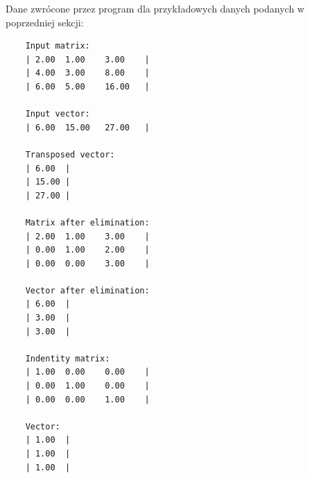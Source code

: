 \documentclass{article}
\begin{document}
Dane zwrócone przez program dla przykładowych danych podanych w poprzedniej sekcji:

\begin{verbatim}
    Input matrix:
    | 2.00  1.00    3.00    |
    | 4.00  3.00    8.00    |
    | 6.00  5.00    16.00   |

    Input vector:
    | 6.00  15.00   27.00   |

    Transposed vector:
    | 6.00  |
    | 15.00 |
    | 27.00 |

    Matrix after elimination:
    | 2.00  1.00    3.00    |
    | 0.00  1.00    2.00    |
    | 0.00  0.00    3.00    |

    Vector after elimination:
    | 6.00  |
    | 3.00  |
    | 3.00  |

    Indentity matrix:
    | 1.00  0.00    0.00    |
    | 0.00  1.00    0.00    |
    | 0.00  0.00    1.00    |

    Vector:
    | 1.00  |
    | 1.00  |
    | 1.00  |
\end{verbatim}
\end{document}
